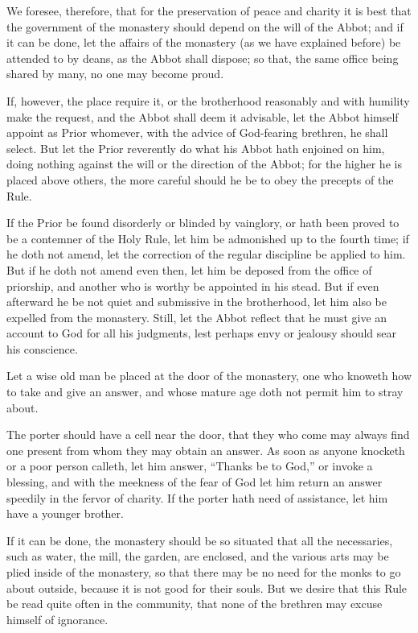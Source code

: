 We foresee, therefore, that for the preservation of peace and charity it is best that the government of the monastery should depend on the will of the Abbot; and if it can be done, let the affairs of the monastery (as we have explained before) be attended to by deans, as the Abbot shall dispose; so that, the same office being shared by many, no one may become proud.

If, however, the place require it, or the brotherhood reasonably and with humility make the request, and the Abbot shall deem it advisable, let the Abbot himself appoint as Prior whomever, with the advice of God-fearing brethren, he shall select. But let the Prior reverently do what his Abbot hath enjoined on him, doing nothing against the will or the direction of the Abbot; for the higher he is placed above others, the more careful should he be to obey the precepts of the Rule.

If the Prior be found disorderly or blinded by vainglory, or hath been proved to be a contemner of the Holy Rule, let him be admonished up to the fourth time; if he doth not amend, let the correction of the regular discipline be applied to him. But if he doth not amend even then, let him be deposed from the office of priorship, and another who is worthy be appointed in his stead. But if even afterward he be not quiet and submissive in the brotherhood, let him also be expelled from the monastery. Still, let the Abbot reflect that he must give an account to God for all his judgments, lest perhaps envy or jealousy should sear his conscience.


Let a wise old man be placed at the door of the monastery, one who knoweth how to take and give an answer, and whose mature age doth not permit him to stray about.

The porter should have a cell near the door, that they who come may always find one present from whom they may obtain an answer. As soon as anyone knocketh or a poor person calleth, let him answer, ``Thanks be to God,'' or invoke a blessing, and with the meekness of the fear of God let him return an answer speedily in the fervor of charity. If the porter hath need of assistance, let him have a younger brother.

If it can be done, the monastery should be so situated that all the necessaries, such as water, the mill, the garden, are enclosed, and the various arts may be plied inside of the monastery, so that there may be no need for the monks to go about outside, because it is not good for their souls. But we desire that this Rule be read quite often in the community, that none of the brethren may excuse himself of ignorance.

